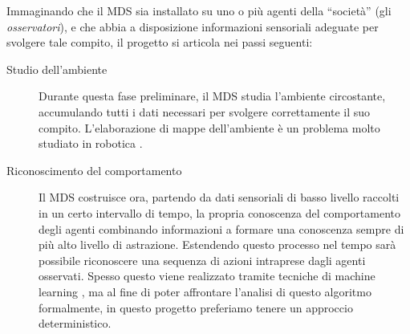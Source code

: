 \documentclass[paper=a4, fontsize=11pt]{scrartcl} %
\numberwithin{equation}{section} %
\numberwithin{table}{section} %
\begin{document}
Immaginando che il MDS sia installato su uno o più agenti della ``società'' (gli \textit{osservatori}), e che abbia a disposizione 
informazioni
sensoriali adeguate per svolgere tale compito, il
progetto si articola nei passi seguenti:
\begin{description}
\item[Studio dell'ambiente] Durante questa fase preliminare, 
il MDS studia l'ambiente circostante, accumulando tutti i dati
necessari per svolgere correttamente il suo compito. L'elaborazione
di mappe dell'ambiente è un problema molto studiato in robotica \cite{mapping}.

\item[Riconoscimento del comportamento] Il MDS
	costruisce ora, partendo da dati sensoriali di basso livello raccolti 
	in un certo intervallo di tempo, la propria
	conoscenza del comportamento degli agenti combinando informazioni 
	a formare una conoscenza sempre di più alto livello di astrazione. Estendendo questo processo nel tempo
	sarà possibile riconoscere una sequenza di azioni intraprese
	dagli agenti osservati. Spesso questo viene realizzato 
	tramite tecniche di machine learning \cite{learning}, ma al fine di poter affrontare
	l'analisi di questo algoritmo formalmente, in questo progetto preferiamo
	tenere un approccio deterministico. 
	

\end{description}
\end{document}
